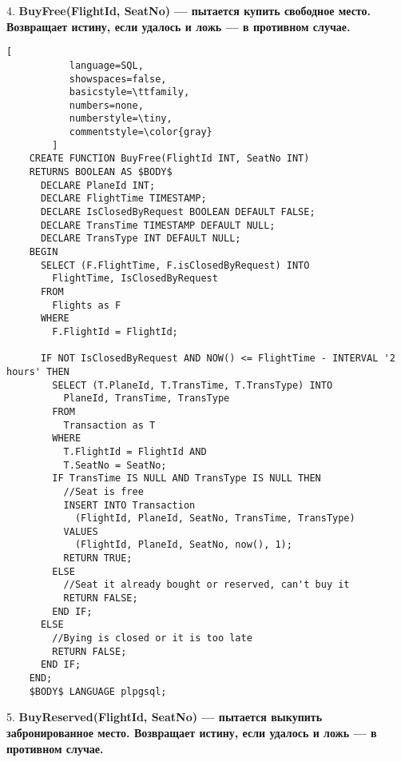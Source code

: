 \documentclass[11pt,a4paper,oneside]{article}
\begin{document}
4. \textbf{BuyFree(FlightId, SeatNo) — пытается купить свободное место. Возвращает истину, если удалось и ложь — в противном случае.}

\begin{lstlisting}[
           language=SQL,
           showspaces=false,
           basicstyle=\ttfamily,
           numbers=none,
           numberstyle=\tiny,
           commentstyle=\color{gray}
        ]
    CREATE FUNCTION BuyFree(FlightId INT, SeatNo INT)
    RETURNS BOOLEAN AS $BODY$
      DECLARE PlaneId INT;
      DECLARE FlightTime TIMESTAMP;
      DECLARE IsClosedByRequest BOOLEAN DEFAULT FALSE;
      DECLARE TransTime TIMESTAMP DEFAULT NULL;
      DECLARE TransType INT DEFAULT NULL;
    BEGIN
      SELECT (F.FlightTime, F.isClosedByRequest) INTO
        FlightTime, IsClosedByRequest
      FROM
        Flights as F
      WHERE
        F.FlightId = FlightId;

      IF NOT IsClosedByRequest AND NOW() <= FlightTime - INTERVAL '2 hours' THEN
        SELECT (T.PlaneId, T.TransTime, T.TransType) INTO
          PlaneId, TransTime, TransType
        FROM
          Transaction as T
        WHERE
          T.FlightId = FlightId AND
          T.SeatNo = SeatNo;
        IF TransTime IS NULL AND TransType IS NULL THEN
          //Seat is free
          INSERT INTO Transaction
            (FlightId, PlaneId, SeatNo, TransTime, TransType)
          VALUES
            (FlightId, PlaneId, SeatNo, now(), 1);
          RETURN TRUE;
        ELSE
          //Seat it already bought or reserved, can't buy it
          RETURN FALSE;
        END IF;
      ELSE
        //Bying is closed or it is too late
        RETURN FALSE;
      END IF;
    END;
    $BODY$ LANGUAGE plpgsql;
\end{lstlisting}

5. \textbf{BuyReserved(FlightId, SeatNo) — пытается выкупить забронированное место. Возвращает истину, если удалось и ложь — в противном случае.}
\end{document}
